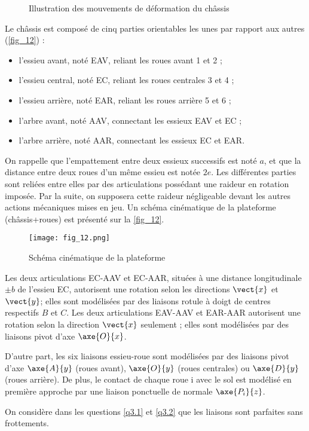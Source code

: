 \begin{multicols}{2}
\begin{figure}[H]
\caption{Illustration des mouvements de déformation du châssis\label{fig_11}}
\end{figure}

Le châssis est composé de cinq parties orientables les unes par rapport aux autres (\autoref{fig_12}) :
\begin{itemize}
\item l'essieu avant, noté EAV, reliant les roues avant 1 et 2 ;
\item l'essieu central, noté EC, reliant les roues centrales 3 et 4 ;
\item l'essieu arrière, noté EAR, reliant les roues arrière 5 et 6 ;
\item l'arbre avant, noté AAV, connectant les essieux EAV et EC ;
\item l'arbre arrière, noté AAR, connectant les essieux EC et EAR.
\end{itemize}
On rappelle que l'empattement entre deux essieux successifs est noté $a$, et que la distance entre
deux roues d'un même essieu est notée $2e$.
Les différentes parties sont reliées entre elles par des articulations possédant une raideur en
rotation imposée. Par la suite, on supposera cette raideur négligeable devant les autres actions
mécaniques mises en jeu.
Un schéma cinématique de la plateforme (châssis+roues) est présenté sur la \autoref{fig_12}.

\begin{figure}[H]
\centering
\texttt{[image: fig\_12.png]}
\caption{Schéma cinématique de la plateforme\label{fig_12}}
\end{figure}

Les deux articulations EC-AAV et EC-AAR, situées à une distance longitudinale $\pm b$ de l'essieu
EC, autorisent une rotation selon les directions $\vect{x}$ et $\vect{y}$; elles sont modélisées par des liaisons
rotule à doigt de centres respectifs $B$ et $C$. Les deux articulations EAV-AAV et EAR-AAR
autorisent une rotation selon la direction $\vect{x}$ seulement ; elles sont modélisées par des liaisons
pivot d'axe $\axe{O}{x}$.

D'autre part, les six liaisons essieu-roue sont modélisées par des liaisons pivot d'axe $\axe{A}{y}$
(roues avant), $\axe{O}{y}$ (roues centrales) ou $\axe{D}{y}$ (roues arrière). De plus, le contact de chaque
roue i avec le sol est modélisé en première approche par une liaison ponctuelle de normale
$\axe{P_i}{z}$.

On considère dans les questions \ref{q3.1} et \ref{q3.2} que les liaisons sont parfaites sans frottements.



\end{multicols}
